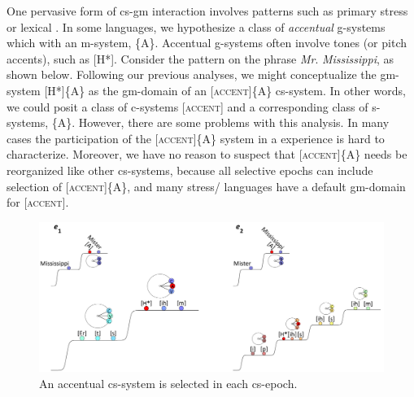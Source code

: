 One pervasive form of cs-gm interaction involves  patterns such as primary stress or lexical . In some languages, we hypothesize a class of \textit{accentual} g-systems which  with an  m-system, \{A\}. Accentual g-systems often involve tones (or pitch accents), such as [H*]. Consider the  pattern on the phrase \textit{Mr}. \textit{Mississippi}, as shown below. Following our previous analyses, we might conceptualize the gm-system [H*]\{A\} as the gm-domain of an  [\textsc{accent}]\{A\} cs-system. In other words, we could posit a class of  c-systems [\textsc{accent}] and a corresponding class of s-systems, \{A\}. However, there are some problems with this analysis. In many cases the participation of the [\textsc{accent}]\{A\} system in a  experience is hard to characterize. Moreover, we have no reason to suspect that [\textsc{accent}]\{A\} needs be reorganized like other cs-systems, because all selective epochs can include selection of [\textsc{accent}]\{A\}, and many stress/ languages have a default gm-domain for [\textsc{accent}].

  
\begin{figure}
\includegraphics[width=\textwidth]{figures/Tilsen-img63.png}
\caption{An accentual cs-system is selected in each cs-epoch.}
\label{fig:4:13}
\end{figure}
 


